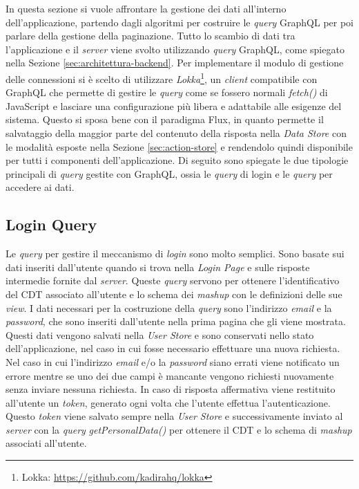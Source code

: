 In questa sezione si vuole affrontare la gestione dei dati all'interno dell'applicazione, partendo dagli algoritmi per costruire le \emph{query} GraphQL per poi parlare della gestione della paginazione.
Tutto lo scambio di dati tra l'applicazione e il \emph{server} viene svolto utilizzando \emph{query} GraphQL, come spiegato nella Sezione \ref{sec:architettura-backend}. Per implementare il modulo di gestione delle connessioni si è scelto di utilizzare \emph{Lokka}\footnote{Lokka: \url{https://github.com/kadirahq/lokka}}, un \emph{client} compatibile con GraphQL che permette di gestire le \emph{query} come se fossero normali \emph{fetch()} di JavaScript e lasciare una configurazione più libera e adattabile alle esigenze del sistema. Questo si sposa bene con il paradigma Flux, in quanto permette il salvataggio della maggior parte del contenuto della risposta nella \emph{Data Store} con le modalità esposte nella Sezione \ref{sec:action-store} e rendendolo quindi disponibile per tutti i componenti dell'applicazione. Di seguito sono spiegate le due tipologie principali di \emph{query} gestite con GraphQL, ossia le \emph{query} di login e le \emph{query} per accedere ai dati.

\subsection{Login Query}

Le \emph{query} per gestire il meccanismo di \emph{login} sono molto semplici. Sono basate sui dati inseriti dall'utente quando si trova nella \emph{Login Page} e sulle risposte intermedie fornite dal \emph{server}. Queste \emph{query} servono per ottenere l'identificativo del CDT associato all'utente e lo schema dei \emph{mashup} con le definizioni delle sue \emph{view}.
I dati necessari per la costruzione della \emph{query} sono l'indirizzo \emph{email} e la \emph{password}, che sono inseriti dall'utente nella prima pagina che gli viene mostrata. Questi dati vengono salvati nella \emph{User Store} e sono conservati nello stato dell'applicazione, nel caso in cui fosse necessario effettuare una nuova richiesta. Nel caso in cui l'indirizzo \emph{email} e/o la \emph{password} siano errati viene notificato un errore mentre se uno dei due campi è mancante vengono richiesti nuovamente senza inviare nessuna richiesta.
In caso di risposta affermativa viene restituito all'utente un \emph{token}, generato ogni volta che l'utente effettua l'autenticazione. Questo \emph{token} viene salvato sempre nella \emph{User Store} e successivamente inviato al \emph{server} con la \emph{query} \emph{getPersonalData()} per ottenere il CDT e lo schema di \emph{mashup} associati all'utente.


